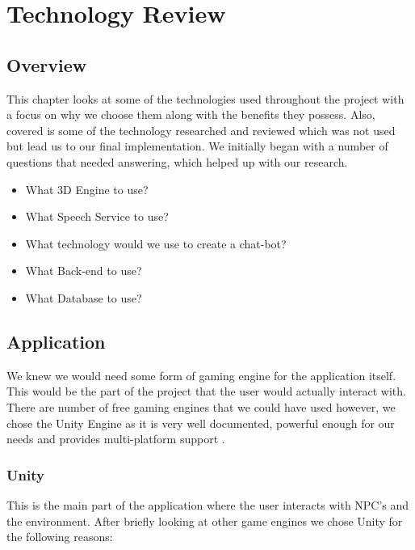\chapter{Technology Review}
\section{Overview}
This chapter looks at some of the technologies used throughout the project with a focus on why we choose them along with the benefits they possess. Also, covered is some of the technology researched and reviewed which was not used but lead us to our final implementation. We initially began with a number of questions that needed answering, which helped up with our research. 

\begin{itemize}
    \item What 3D Engine to use?
    \item What Speech Service to use?
    \item What technology would we use to create a chat-bot?
    \item What Back-end to use?
    \item What Database to use?
\end{itemize}

\section{Application}
We knew we would need some form of gaming engine for the application itself. This would be the part of the project that the user would actually interact with. There are number of free gaming engines that we could have used however, we chose the Unity Engine as it is very well documented, powerful enough for our needs and provides multi-platform support \cite{unity}.

\subsection{Unity}
This is the main part of the application where the user interacts with NPC's and the environment. After briefly looking at other game engines we chose Unity for the following reasons:


